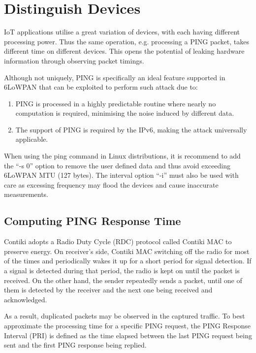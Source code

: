 \section{Distinguish Devices}\label{Sec:DistinguishDevice}
IoT applications utilise a great variation of devices, with each having different processing power. Thus the same operation, e.g. processing a PING packet, takes different time on different devices. This opens the potential of leaking hardware information through observing packet timings.

Although not uniquely, PING is specifically an ideal feature supported in 6LoWPAN that can be exploited to perform such attack due to:
\begin{enumerate}
	\item PING is processed in a highly predictable routine where nearly no computation is required, minimising the noise induced by different data.
	\item The support of PING is required by the IPv6\cite{rfc4443}, making the attack universally applicable.
\end{enumerate}

When using the ping command in Linux distributions, it is recommend to add the ``-s 0'' option to remove the user defined data and thus avoid exceeding 6LoWPAN MTU (127 bytes). The interval option  ``-i'' must also be used with care as excessing frequency may flood the devices and cause inaccurate measurements.

\subsection{Computing PING Response Time}\label{TimingWithContikiMAC}
Contiki adopts a Radio Duty Cycle (RDC) protocol called Contiki MAC\cite{ContikiMAC} to preserve energy. On receiver's side, Contiki MAC switching off the radio for most of the times and periodically wakes it up for a short period for signal detection. If a signal is detected during that period, the radio is kept on until the packet is received. On the other hand, the sender repeatedly sends a packet, until one of them is detected by the receiver and the next one being received and acknowledged.

As a result, duplicated packets may be observed in the captured traffic. To best approximate the processing time for a specific PING request, the PING Response Interval (PRI) is defined as the time elapsed between the last PING request being sent and the first PING response being replied. 

